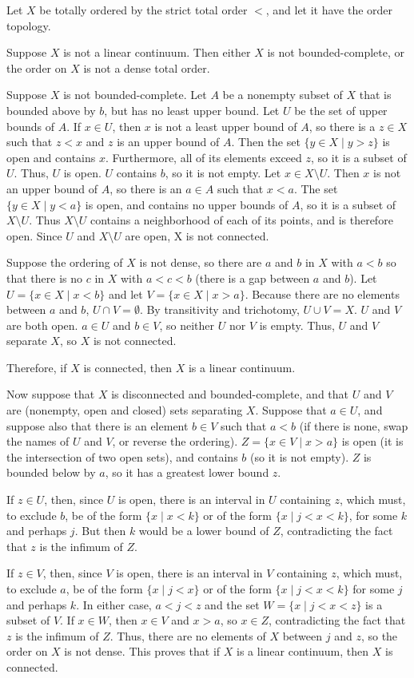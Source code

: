 \documentclass[12pt]{article}
\begin{document}
Let $X$ be totally ordered by the strict total order $<$, and let it have the order topology.

Suppose $X$ is not a linear continuum.  Then either $X$ is not bounded-complete, or the order on $X$ is not a dense total order.

Suppose $X$ is not bounded-complete.  Let $A$ be a nonempty subset of $X$ that is bounded above by $b$, but has no least upper bound.  Let $U$ be the set of upper bounds of $A$.  If $x \in U$, then $x$ is not a least upper bound of $A$, so there is a $z \in X$ such that $z<x$ and $z$ is an upper bound of $A$.  Then the set $\{y\in X \mid y>z\}$ is open and contains $x$.  Furthermore, all of its elements exceed $z$, so it is a subset of $U$.  Thus, $U$ is open.  $U$ contains $b$, so it is not empty.  Let $x\in X \setminus U$.  Then $x$ is not an upper bound of $A$, so there is an $a \in A$ such that $x < a$.  The set $\{y \in X \mid y < a\}$ is open, and contains no upper bounds of $A$, so it is a subset of $X \setminus U$.  Thus $X \setminus U$ contains a neighborhood of each of its points, and is therefore open.  Since $U$ and $X \setminus U$ are open, X is not connected.

Suppose the ordering of $X$ is not dense, so there are $a$ and $b$ in $X$ with $a<b$ so that there is no $c$ in $X$ with $a<c<b$ (there is a gap between $a$ and $b$).  Let $U = \{x \in X \mid x < b\}$ and let $V = \{x \in X \mid x > a\}$.  Because there are no elements between $a$ and $b$, $U \cap V = \emptyset$.  By transitivity and trichotomy, $U \cup V = X$.  $U$ and $V$ are both open.  $a \in U$ and $b \in V$, so neither $U$ nor $V$ is empty. Thus, $U$ and $V$ separate $X$, so $X$ is not connected.

Therefore, if $X$ is connected, then $X$ is a linear continuum.

Now suppose that $X$ is disconnected and bounded-complete, and that $U$ and $V$ are (nonempty, open and closed) sets separating $X$.  Suppose that $a \in U$, and suppose also that there is an element $b \in V$ such that $a < b$ (if there is none, swap the names of $U$ and $V$, or reverse the ordering).  $Z = \{x \in V \mid x > a\}$ is open (it is the intersection of two open sets), and contains $b$ (so it is not empty).  $Z$ is bounded below by $a$, so it has a greatest lower bound $z$.

If $z \in U$, then, since $U$ is open, there is an interval in $U$ containing $z$, which must, to exclude $b$, be of the form $\{x\mid x<k\}$ or of the form $\{x\mid j<x<k\}$, for some $k$ and perhaps $j$.  But then $k$ would be a lower bound of $Z$, contradicting the fact that $z$ is the infimum of $Z$.

If $z \in V$, then, since $V$ is open, there is an interval in $V$ containing $z$, which must, to exclude $a$, be of the form $\{x\mid j<x\}$ or of the form $\{x\mid j<x<k\}$ for some $j$ and perhaps $k$.  In either case, $a<j<z$ and the set $W=\{x\mid j<x<z\}$ is a subset of $V$.  If $x \in W$, then $x \in V$ and $x > a$, so $x \in Z$, contradicting the fact that $z$ is the infimum of $Z$.  Thus, there are no elements of $X$ between $j$ and $z$, so the order on $X$ is not dense.  This proves that if $X$ is a linear continuum, then $X$ is connected.
\end{document}
